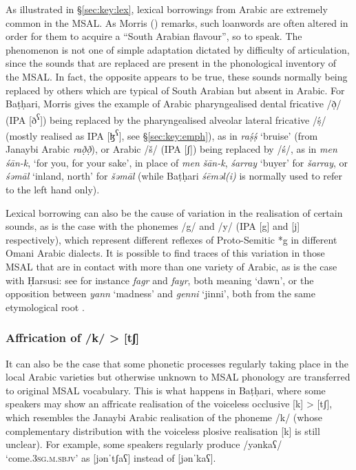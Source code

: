 \documentclass[output=paper]{langsci/langscibook}
\begin{document}
As illustrated in §\ref{sec:key:lex}, lexical borrowings from Arabic are extremely common in the MSAL. As Morris (\citeyear[13]{Morris2017}) remarks, such loanwords are often altered in order for them to acquire a “South Arabian flavour”, so to speak. The phenomenon is not one of simple adaptation dictated by difficulty of articulation, since the sounds that are replaced are present in the phonological inventory of the MSAL. In fact, the opposite appears to be true, these sounds normally being replaced by others which are typical of South Arabian but absent in Arabic. For Baṭḥari, Morris gives the example of Arabic pharyngealised dental fricative /\d{ð}/ (IPA [ð\textsuperscript{ʕ}]) being replaced by the pharyngealised alveolar lateral fricative /ṣ́/ (mostly realised as IPA [ɮ\textsuperscript{ʕ}], see §\ref{sec:key:emph}), as in \textit{raṣ́ṣ́} ‘bruise’ (from Janaybi Arabic \textit{rað̣ð̣}), or Arabic /š/ (IPA [ʃ]) being replaced by /ś/, as in \textit{men} \textit{śān-k}, ‘for you, for your sake’, in place of \textit{men} \textit{šān-k}, \textit{śarray} ‘buyer’ for \textit{šarray}, or \textit{śəmāl} ‘inland, north’ for \textit{šəmāl} (while Baṭḥari \textit{śēməl(i)} is normally used to refer to the left hand only). 

Lexical borrowing can also be the cause of variation in the realisation of certain sounds, as is the case with the phonemes /g/ and /y/ (IPA [g] and [j] respectively), which represent different reflexes of Proto-Semitic *g in different Omani Arabic dialects. It is possible to find traces of this variation in those MSAL that are in contact with more than one variety of Arabic, as is the case with Ḥarsusi: see for instance \textit{fagr} and \textit{fayr}, both meaning ‘dawn’, or the opposition between \textit{yann} ‘madness’ and \textit{genni} ‘jinni’, both from the same etymological root \citep[299]{Lonnet2011}.


 \subsubsection{Affrication of /k/ > [tʃ]}

It can also be the case that some phonetic processes regularly taking place in the local Arabic varieties but otherwise unknown to MSAL phonology are transferred to original MSAL vocabulary. This is what happens in Baṭḥari, where some speakers may show an affricate realisation of the voiceless occlusive [k] > [tʃ], which resembles the Janaybi Arabic realisation of the phoneme /k/ (whose complementary distribution with the voiceless plosive realisation [k] is still unclear). For example, some speakers regularly produce /yənkaʕ/ ‘come.\textsc{3sg.m.sbjv}’ as [jənˈtʃaʕ] instead of [jənˈkaʕ]. 
\end{document}
